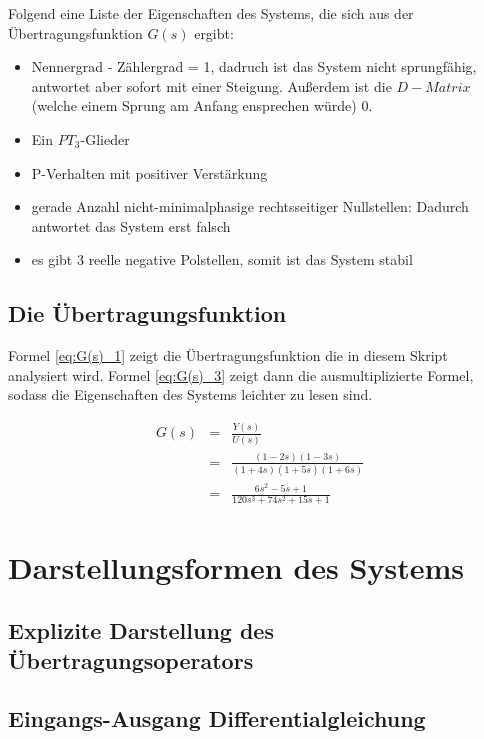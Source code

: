 Folgend eine Liste der Eigenschaften des Systems, die sich aus der Übertragungsfunktion $G(s)$ ergibt:

\begin{itemize}
    \item Nennergrad - Zählergrad = 1, dadruch ist das System nicht sprungfähig, antwortet aber sofort mit einer Steigung. Außerdem ist die $D-Matrix$ (welche einem Sprung am Anfang ensprechen würde) $0$.
    \item Ein $PT_3$-Glieder
    \item P-Verhalten mit positiver Verstärkung
    \item gerade Anzahl nicht-minimalphasige rechtsseitiger Nullstellen: Dadurch antwortet das System erst falsch
    \item es gibt 3 reelle negative Polstellen, somit ist das System stabil
\end{itemize}

\subsection{Die Übertragungsfunktion}

Formel \ref{eq:G(s)_1} zeigt die Übertragungsfunktion die in diesem Skript analysiert wird. Formel \ref{eq:G(s)_3} zeigt dann die ausmultiplizierte Formel, sodass die Eigenschaften des Systems leichter zu lesen sind.

\begin{eqnarray}
    \label{eq:G(s)_1}
    G(s) &=& \frac{Y(s)}{U(s)} \\
    \label{eq:G(s)_2}
    &=& \frac{(1-2s)(1-3s)}{(1+4s)(1+5s)(1+6s)} \\
    \label{eq:G(s)_3}
    &=& \frac{6s^2 - 5s + 1}{120s^3 + 74s^2 + 15s +1}
\end{eqnarray}

\section{Darstellungsformen des Systems}

\subsection{Explizite Darstellung des Übertragungsoperators}

\subsection{Eingangs-Ausgang Differentialgleichung}

